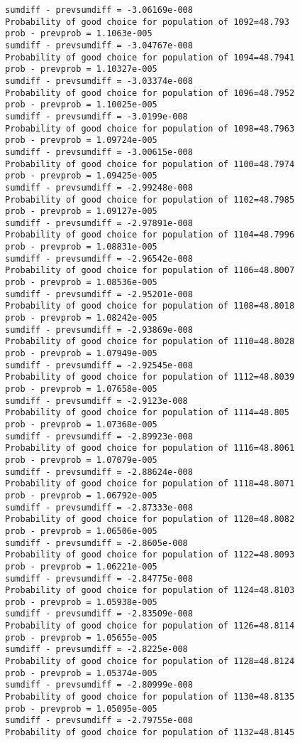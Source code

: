 \documentclass[11pt,onecolumn]{article}
\begin{document}
\begin{verbatim}
sumdiff - prevsumdiff = -3.06169e-008
Probability of good choice for population of 1092=48.793
prob - prevprob = 1.1063e-005
sumdiff - prevsumdiff = -3.04767e-008
Probability of good choice for population of 1094=48.7941
prob - prevprob = 1.10327e-005
sumdiff - prevsumdiff = -3.03374e-008
Probability of good choice for population of 1096=48.7952
prob - prevprob = 1.10025e-005
sumdiff - prevsumdiff = -3.0199e-008
Probability of good choice for population of 1098=48.7963
prob - prevprob = 1.09724e-005
sumdiff - prevsumdiff = -3.00615e-008
Probability of good choice for population of 1100=48.7974
prob - prevprob = 1.09425e-005
sumdiff - prevsumdiff = -2.99248e-008
Probability of good choice for population of 1102=48.7985
prob - prevprob = 1.09127e-005
sumdiff - prevsumdiff = -2.97891e-008
Probability of good choice for population of 1104=48.7996
prob - prevprob = 1.08831e-005
sumdiff - prevsumdiff = -2.96542e-008
Probability of good choice for population of 1106=48.8007
prob - prevprob = 1.08536e-005
sumdiff - prevsumdiff = -2.95201e-008
Probability of good choice for population of 1108=48.8018
prob - prevprob = 1.08242e-005
sumdiff - prevsumdiff = -2.93869e-008
Probability of good choice for population of 1110=48.8028
prob - prevprob = 1.07949e-005
sumdiff - prevsumdiff = -2.92545e-008
Probability of good choice for population of 1112=48.8039
prob - prevprob = 1.07658e-005
sumdiff - prevsumdiff = -2.9123e-008
Probability of good choice for population of 1114=48.805
prob - prevprob = 1.07368e-005
sumdiff - prevsumdiff = -2.89923e-008
Probability of good choice for population of 1116=48.8061
prob - prevprob = 1.07079e-005
sumdiff - prevsumdiff = -2.88624e-008
Probability of good choice for population of 1118=48.8071
prob - prevprob = 1.06792e-005
sumdiff - prevsumdiff = -2.87333e-008
Probability of good choice for population of 1120=48.8082
prob - prevprob = 1.06506e-005
sumdiff - prevsumdiff = -2.8605e-008
Probability of good choice for population of 1122=48.8093
prob - prevprob = 1.06221e-005
sumdiff - prevsumdiff = -2.84775e-008
Probability of good choice for population of 1124=48.8103
prob - prevprob = 1.05938e-005
sumdiff - prevsumdiff = -2.83509e-008
Probability of good choice for population of 1126=48.8114
prob - prevprob = 1.05655e-005
sumdiff - prevsumdiff = -2.8225e-008
Probability of good choice for population of 1128=48.8124
prob - prevprob = 1.05374e-005
sumdiff - prevsumdiff = -2.80999e-008
Probability of good choice for population of 1130=48.8135
prob - prevprob = 1.05095e-005
sumdiff - prevsumdiff = -2.79755e-008
Probability of good choice for population of 1132=48.8145

\end{verbatim}
\end{document}
